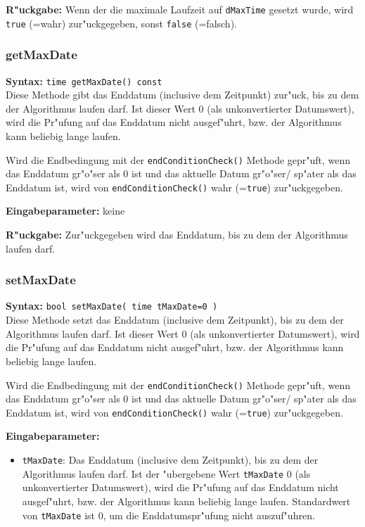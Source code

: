 \bigskip\noindent
\textbf{R"uckgabe:} Wenn der die maximale Laufzeit auf \verb|dMaxTime| gesetzt wurde, wird \verb|true| (=wahr) zur"uckgegeben, sonst \verb|false| (=falsch).


\subsubsection{getMaxDate}

\textbf{Syntax:} \verb|time getMaxDate() const| \\

Diese Methode gibt das Enddatum (inclusive dem Zeitpunkt) zur"uck, bis zu dem der Algorithmus laufen darf. Ist dieser Wert $0$ (als unkonvertierter Datumswert), wird die Pr"ufung auf das Enddatum nicht ausgef"uhrt, bzw. der Algorithmus kann beliebig lange laufen.

Wird die Endbedingung mit der \verb|endConditionCheck()| Methode gepr"uft, wenn das Enddatum gr"o"ser als $0$ ist und das aktuelle Datum gr"o"ser/ sp"ater als das Enddatum ist, wird von \verb|endConditionCheck()| wahr (=\verb|true|) zur"uckgegeben.

\bigskip\noindent
\textbf{Eingabeparameter:} keine

\bigskip\noindent
\textbf{R"uckgabe:} Zur"uckgegeben wird das Enddatum, bis zu dem der Algorithmus laufen darf.


\subsubsection{setMaxDate}

\textbf{Syntax:} \verb|bool setMaxDate( time tMaxDate=0 )| \\

Diese Methode setzt das Enddatum (inclusive dem Zeitpunkt), bis zu dem der Algorithmus laufen darf. Ist dieser Wert $0$ (als unkonvertierter Datumswert), wird die Pr"ufung auf das Enddatum nicht ausgef"uhrt, bzw. der Algorithmus kann beliebig lange laufen.

Wird die Endbedingung mit der \verb|endConditionCheck()| Methode gepr"uft, wenn das Enddatum gr"o"ser als $0$ ist und das aktuelle Datum gr"o"ser/ sp"ater als das Enddatum ist, wird von \verb|endConditionCheck()| wahr (=\verb|true|) zur"uckgegeben.

\bigskip\noindent
\textbf{Eingabeparameter:}
\begin{itemize}
 \item \verb|tMaxDate|: Das Enddatum (inclusive dem Zeitpunkt), bis zu dem der Algorithmus laufen darf. Ist der "ubergebene Wert \verb|tMaxDate| $0$ (als unkonvertierter Datumswert), wird die Pr"ufung auf das Enddatum nicht ausgef"uhrt, bzw. der Algorithmus kann beliebig lange laufen. Standardwert von \verb|tMaxDate| ist $0$, um die Enddatumspr"ufung nicht auszuf"uhren.
\end{itemize}

